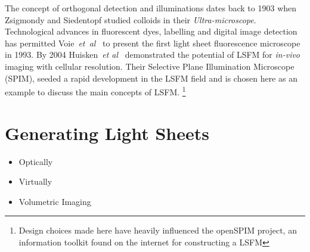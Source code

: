 The concept of orthogonal detection and illuminations dates back to 1903 when Zsigmondy and Siedentopf studied colloids in their \textit{Ultra-microscope}.
Technological advances in fluorescent dyes, labelling and digital image detection has permitted Voie~\emph{et~al}~\cite{voie_orthogonal-plane_1993}
to present the first light sheet fluorescence microscope in 1993.
By 2004 Huisken~\emph{et al}~\cite{huisken_optical_2004-1}
demonstrated the potential of LSFM for \emph{in-vivo} imaging with cellular resolution.
Their Selective Plane Illumination Microscope (SPIM), seeded a rapid development in the LSFM field and is chosen here as an example to discuss the main concepts of LSFM.\@
\footnote{Design choices made here have heavily influenced the openSPIM project, an information toolkit found on the internet for constructing a LSFM}





\section{Generating Light Sheets}

\begin{itemize}
	\item[\checked] Optically  %
	\item[\checked] Virtually
	\item[\checked] Volumetric Imaging
\end{itemize}	%

